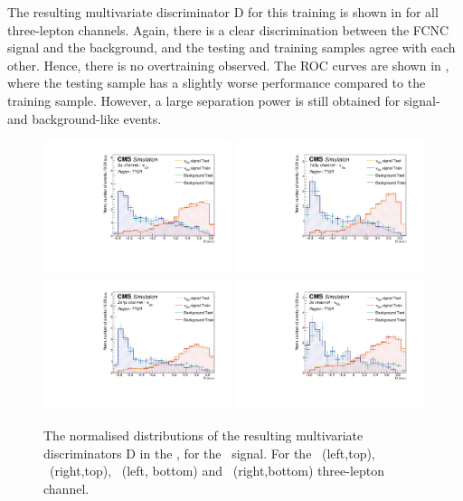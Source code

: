 \clearpage
The resulting multivariate discriminator D for this training is shown in  for all three-lepton channels. Again, there is a clear discrimination between the FCNC signal and the background, and the testing and training samples agree with each other. Hence, there is no overtraining observed. The ROC curves are shown in , where the testing sample has a slightly worse performance compared to the training sample. However, a large separation power is still obtained for signal- and background-like events. 
\begin{figure}[htbp]
	\centering
	\includegraphics[width=0.49\textwidth]{6_Search/Figures/PlotsTechnics/SigVsBkgTestZuttoppairuuu}
	\includegraphics[width=0.49\textwidth]{6_Search/Figures/PlotsTechnics/SigVsBkgTestZuttoppairuue}
	\includegraphics[width=0.49\textwidth]{6_Search/Figures/PlotsTechnics/SigVsBkgTestZuttoppaireeu}
	\includegraphics[width=0.49\textwidth]{6_Search/Figures/PlotsTechnics/SigVsBkgTestZuttoppaireee}
	\caption{The normalised distributions of the resulting  multivariate discriminators D in the \TTSR, for the \Zut\ signal. For the \mumumu\ (left,top), \emumu\ (right,top), \eemu\ (left, bottom) and \eee\ (right,bottom) three-lepton channel.}
	\label{fig:sigvsbkgtestzuttoppair}
\end{figure}


